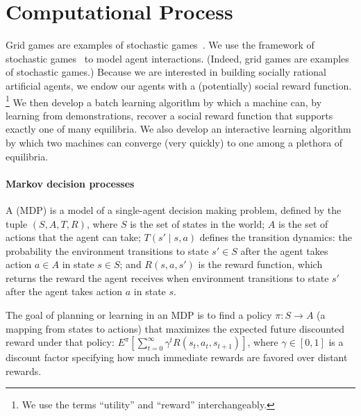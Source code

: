 
\section{Computational Process}
\label{sec:process}

Grid games are examples of stochastic
games~\cite{Shapley53,non-zero-sum}.  We use the framework of
stochastic games~\cite{Shapley53,non-zero-sum} to model agent
interactions.  (Indeed, grid games are examples of stochastic games.)
%
Because we are interested in building socially rational artificial agents,
we endow our agents with a (potentially) social reward function.%
\footnote{We use the terms ``utility'' and ``reward'' interchangeably.}  
%
We then develop a batch learning algorithm by which a machine can, by
learning from demonstrations, recover a social reward function that
supports exactly one of many equilibria.
%
We also develop an interactive learning algorithm by which two
machines can converge (very quickly) to one among a plethora of
equilibria.


\paragraph{Markov decision processes}

A  (MDP) is a model of a single-agent
decision making problem, defined by the tuple $(S, A, T, R)$, where
$S$ is the set of states in the world; $A$ is the set of actions that
the agent can take; $T(s' \mid s, a)$ defines the transition dynamics:
the probability the environment transitions to state $s' \in S$
after the agent takes action $a \in A$ in state $s \in S$; and 
$R(s, a, s')$ is the reward function, which returns the reward the
agent receives when environment transitions to state $s'$ after the
agent takes action $a$ in state $s$.

The goal of planning or learning in an MDP is to find a policy $\pi :
S \rightarrow A$ (a mapping from states to actions) that maximizes the
expected future discounted reward under that policy: $E^{\pi} \left[
  \sum_{t=0}^\infty \gamma^t R(s_t, a_t, s_{t+1}) \right]$, where
$\gamma \in [0, 1]$ is a discount factor specifying how much immediate
rewards are favored over distant rewards. 

